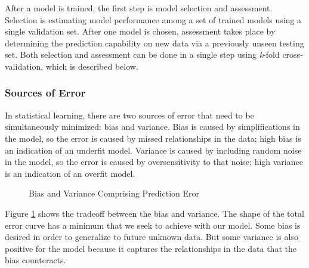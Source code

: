 After a model is trained, the first step is model selection and assessment.
Selection is estimating model performance among a set of trained models using a
single validation set.  After one model is chosen, assessment takes place by
determining the prediction capability on new data via a previously unseen
testing set. Both selection and assessment can be done in a single step using
\textit{k}-fold cross-validation, which is described below.

\subsubsection{Sources of Error} 

In statistical learning, there are two sources of error that need to be
simultaneously minimized: bias and variance. Bias is caused by simplifications
in the model, so the error is caused by missed relationships in the data; high
bias is an indication of an underfit model.  Variance is caused by including
random noise in the model, so the error is caused by oversensitivity to that
noise; high variance is an indication of an overfit model. 

\begin{figure}[!htb]
  \caption{Bias and Variance Comprising Prediction Eror}
  \label{fig:bvtradeoff}
\end{figure}

Figure \ref{fig:bvtradeoff} shows the tradeoff between the bias and variance.
The shape of the total error curve has a minimum that we seek to achieve with
our model. Some bias is desired in order to generalize to future unknown data.
But some variance is also positive for the model because it captures the
relationships in the data that the bias counteracts. 

